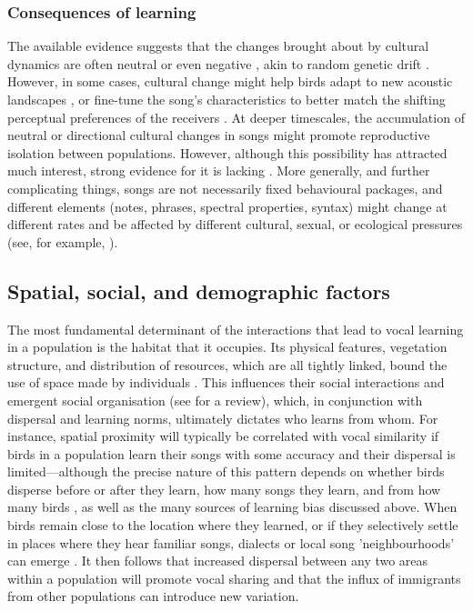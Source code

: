 \subsubsection{Consequences of learning}
The available evidence suggests that the changes brought about by cultural dynamics are often neutral or even negative \autocite{langin2017,slater2003}, akin to random genetic drift \autocite{Grant2010}. However, in some cases, cultural change might help birds adapt to new acoustic landscapes \autocite{rios-chelen2012,slater2003}, or fine-tune the song’s characteristics to better match the shifting perceptual preferences of the receivers \autocite{Renoult2019b}. At deeper timescales, the accumulation of neutral or directional cultural changes in songs might promote reproductive isolation between populations. However, although this possibility has attracted much interest, strong evidence for it is lacking \autocite{freeman2022,Lachlan2004,verzijden2012,Yeh2015}. More generally, and further complicating things, songs are not necessarily fixed behavioural packages, and different elements (notes, phrases, spectral properties, syntax) might change at different rates and be affected by different cultural, sexual, or ecological pressures (see, for example, \cite{williams2013}).

\subsection{Spatial, social, and demographic factors}
The most fundamental determinant of the interactions that lead to vocal learning in a population is the habitat that it occupies. Its physical features, vegetation structure, and distribution of resources, which are all tightly linked, bound the use of space made by individuals \autocite{spiegel2016, albery2021, firth2016}. This influences their social interactions and emergent social organisation (see \cite{he2019} for a review), which, in conjunction with dispersal and learning norms, ultimately dictates who learns from whom. For instance, spatial proximity will typically be correlated with vocal similarity if birds in a population learn their songs with some accuracy and their dispersal is limited---although the precise nature of this pattern depends on whether birds disperse before or after they learn, how many songs they learn, and from how many birds \autocite{ellers2003,williams1990}, as well as the many sources of learning bias discussed above. When birds remain close to the location where they learned, or if they selectively settle in places where they hear familiar songs, dialects or local song 'neighbourhoods’ can emerge \autocite{podos2007}. It then follows that increased dispersal between any two areas within a population will promote vocal sharing and that the influx of immigrants from other populations can introduce new variation.

